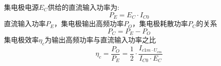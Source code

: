 \documentclass{ctexart}
\begin{document}
    集电极电源$E_C$供给的直流输入功率为:
    \begin{equation}
        P_E=E_C\cdot I_{C0}
    \end{equation}
    直流输入功率$P_E$，集电极输出高频功率$P_O$，集电极耗散功率$P_C$的关系
    \begin{equation}
        P_C=P_E-P_O
    \end{equation}
    集电极效率$\eta_c$为输出高频功率与直流输入功率之比
    \begin{equation}
        \eta_c=\frac{P_O}{P_E}=\frac{1}{2}\cdot\frac{I_{c1m\cdot U_{cm}}}{I_{C0}\cdot E_C}
    \end{equation}

    \newpage
\end{document}

